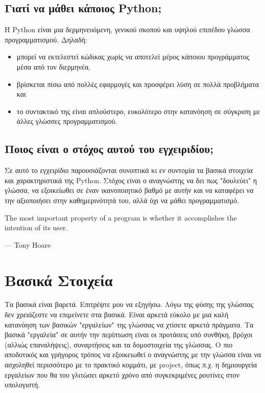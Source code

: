 \documentclass[12pt]{extreport}
\begin{document}
\section{Γιατί να μάθει κάποιος Python;}

Η Python είναι μια δερμηνευόμενη, γενικού σκοπού και υψηλού επιπέδου γλώσσα
προγραμματισμού. Δηλαδή:
\begin{itemize}
    \item μπορεί να εκτελεστεί κώδικας χωρίς να αποτελεί μέρος κάποιου προγράμματος μέσα από τον διερμηνέα,
    \item βρίσκεται πίσω από πολλές εφαρμογές και προσφέρει λύση σε πολλά
          προβλήματα και
    \item το συντακτικό της είναι απλούστερο, ευκολότερο στην κατανόηση σε
          σύγκριση με άλλες γλώσσες προγραμματισμού.
\end{itemize}

\section{Ποιος είναι ο στόχος αυτού του εγχειριδίου;}

Σε αυτό το εγχειρίδιο παρουσιάζονται συνοπτικά κι εν συντομία τα βασικά στοιχεία και χαρακτηριστικά της Python. Στόχος είναι ο αναγνώστης να δει πως "δουλεύει" η γλώσσα, να εξοικείωθει σε έναν ικανοποιητικό βαθμό με αυτήν και να καταφέρει να την αξιοποιήσει στην καθημερινότητά του, αλλά όχι να μάθει προγραμματισμό.

\epigraph{The most important property of a program is whether it accomplishes the intention of its user.}{--- Tony Hoare}

\chapter{Βασικά Στοιχεία}

Τα βασικά είναι βαρετά. Επιτρέψτε μου να εξηγήσω. Λόγω της φύσης της γλώσσας δεν χρειάζεστε να επιμείνετε στα βασικά. Είναι αρκετά εύκολο με μια καλή κατανόηση των βασικών "εργαλείων" της γλώσσας να χτίσετε αρκετά πράγματα. Τα βασικά "εργαλεία" σε αυτήν την περίπτωση είναι οι προτάσεις υπό συνθήκη, βρόχοι (αλλιώς επαναλήψεις), συναρτήσεις και τα δομοστοιχεία της γλώσσας. Ο πιο αποδοτικός και γρήγορος τρόπος να εξοικειωθεί ο αναγνώστης με την γλώσσα είναι να ασχοληθεί περισσότερο με το πρακτικό κομμάτι, με project, όπως π.χ. η δημιουργεία εργαλείων που θα του γλιτώσει αρκετό χρόνο από συγκεκριμένες ρουτίνες στον υπολογιστή.
\end{document}

